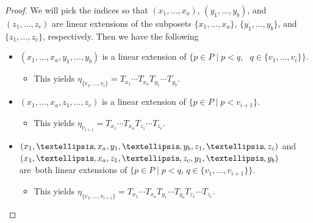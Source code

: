 \documentclass[10pt]{amsart}
\theoremstyle{definition}
\newcommand*{\mk}{\mkern -1mu}
\begin{document}
\begin{proof}
We will pick the indices so that $(x_1,\dots, x_a)$, $(y_1,\dots,y_b)$, and $(z_1,\dots,z_c)$ are linear extensions of the subposets $\{x_1,\dots,x_a\}$, $\{y_1,\dots,y_b\}$, and $\{z_1,\dots,z_c\}$, respectively. Then we have the following
\begin{itemize}
\item $(x_1,\dots,x_a,y_1,\dots,y_b)$ is a linear extension of $\big\{p\in P\;|\; p<q$, \ $q\in\{v_1,\dots, v_i\}\big\}$.
\begin{itemize}
\item This yields $\eta_{\{v_1,\dots,v_i\}}=T_{x_1}\cdots T_{x_a}T_{y_1}\cdots T_{y_b}$.
\end{itemize}
\item $(x_1,\dots,x_a,z_1,\dots,z_c)$ is a linear extension of $\{p\in P \;|\; p<v_{i+1}\}$.
\begin{itemize}
\item This yields $\eta_{v_{i+1}}=T_{x_1}\cdots T_{x_a}T_{z_1}\cdots T_{z_c}$.
\end{itemize}
\item $(x_1,\dots\mk,x_a,y_1,\dots\mk,y_b,z_1,\dots\mk,z_c)$ and 
$(x_1,\dots\mk,x_a,z_1,\dots\mk,z_c,y_1,\dots\mk,y_b)$ are~both linear extensions of $\big\{p\in P \;|\; p<q$, $q\in\{v_1,\dots, v_{i+1}\}\big\}$.
\begin{itemize}
\item This yields $\eta_{\{v_1,\dots,v_{i+1}\}}=T_{x_1}\cdots T_{x_a}T_{y_1}\cdots T_{y_b}T_{z_1}\cdots T_{z_c}$.
\end{itemize}
\end{itemize}


\end{proof}
\end{document}
